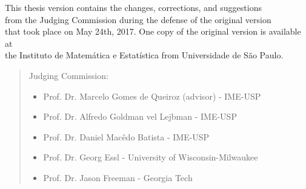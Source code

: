 \documentclass[11pt,twoside,a4paper]{book}
\begin{document}
	    \begin{flushright} 
	    This thesis version contains the changes, corrections, and suggestions\\%
		from the Judging Commission during the defense of the original version\\%
		that took place on May 24th, 2017. One copy of the original version is available at\\ %
		the Instituto de Matemática e Estatística from Universidade de São Paulo.%
		
	
	    \vskip 2cm
	
	    \end{flushright}
	    \vskip 4.2cm
	
	    \begin{quote}
	    \noindent Judging Commission:
	    
	    \begin{itemize}
			\item Prof. Dr. Marcelo Gomes de Queiroz (advisor) - IME-USP
			\item Prof. Dr. Alfredo Goldman vel Lejbman - IME-USP
			\item Prof. Dr. Daniel Macêdo Batista - IME-USP
			\item Prof. Dr. Georg Essl - University of Wisconsin-Milwaukee
			\item Prof. Dr. Jason Freeman - Georgia Tech
	    \end{itemize}
	      
	    \end{quote}
	\pagebreak
	
	
	
	
\end{document}
